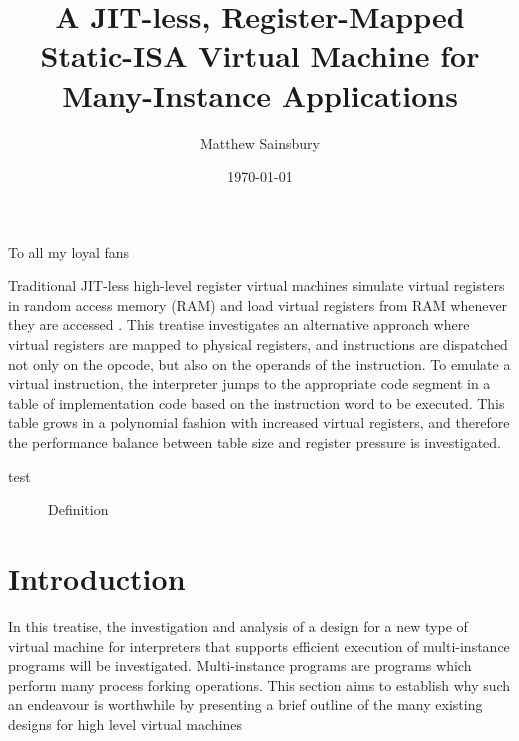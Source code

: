 



\title{A JIT-less, Register-Mapped Static-ISA Virtual Machine for Many-Instance Applications}
\author{Matthew Sainsbury}
\date{\today}

\begin{titlepage}
	\maketitle
\end{titlepage}


	To all my loyal fans

	Traditional JIT-less high-level register virtual machines simulate virtual registers in random access memory (RAM) and load virtual registers from RAM whenever they are accessed \citep{caseregistervm}. This treatise investigates an alternative approach where virtual registers are mapped to physical registers, and instructions are dispatched not only on the opcode, but also on the operands of the instruction. To emulate a virtual instruction, the interpreter jumps to the appropriate code segment in a table of implementation code based on the instruction word to be executed. This table grows in a polynomial fashion with increased virtual registers, and therefore the performance balance between table size and register pressure is investigated.


\begin{description}
	\item[test] Definition
\end{description}

\tableofcontents

\chapter{Introduction}
	\startrealnumbers
	In this treatise, the investigation and analysis of a design for a new type of virtual machine for interpreters that supports efficient execution of multi-instance programs will be investigated. Multi-instance programs are programs which perform many process forking operations. This section aims to establish why such an endeavour is worthwhile by presenting a brief outline of the many existing designs for high level virtual machines
	
